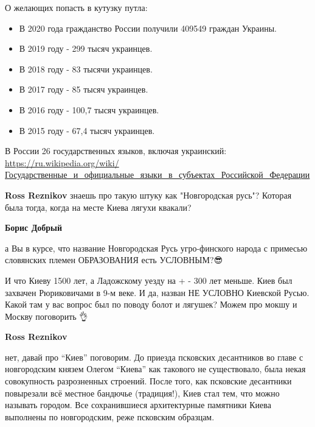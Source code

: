 \begin{itemize}
\begin{itemize}
О желающих попасть в кутузку путла:

\begin{itemize}
  \item В 2020 года гражданство России получили 409549 граждан Украины.
  \item В 2019 году - 299 тысяч украинцев.
  \item В 2018 году - 83 тысячи украинцев.
  \item В 2017 году - 85 тысяч украинцев.
  \item В 2016 году - 100,7 тысяч украинцев.
  \item В 2015 году - 67,4 тысяч украинцев.
\end{itemize}

В России 26 государственных языков, включая украинский:
\url{https://ru.wikipedia.org/wiki/Государственные_и_официальные_языки_в_субъектах_Российской_Федерации}


\textbf{Ross Reznikov} знаешь про такую штуку как "Новгородская русь"? Которая
была тогда, когда на месте Киева лягухи квакали?



\textbf{Борис Добрый} 

а Вы в курсе, что название Новгородская Русь угро-финского народа с примесью
словянских племен ОБРАЗОВАНИЯ есть УСЛОВНЫМ?😎

И что Киеву 1500 лет, а Ладожскому уезду на + - 300 лет меньше. Киев был
захвачен Рюриковичами в 9-м веке. И да, назван НЕ УСЛОВНО Киевской Русью. Какой
там у вас вопрос был по поводу болот и лягушек? Можем про мокшу и Москву
поговорить 👌\Laughey[1.0][white]


\textbf{Ross Reznikov} 

нет, давай про \enquote{Киев} поговорим. До приезда псковских десантников во главе с
новгородским князем Олегом \enquote{Киева} как такового не существовало, была некая
совокупность разрозненных строений. После того, как псковские десантники
повырезали всё местное бандючье (традиция!), Киев стал тем, что можно называть
городом. Все сохранившиеся архитектурные памятники Киева выполнены по
новгородским, реже псковским образцам.


\end{itemize}
\end{itemize}
